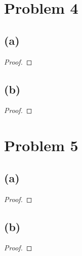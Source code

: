 \documentclass[14pt]{extarticle}
\begin{document}
\section{Problem 4}
\subsection{(a)}
\begin{proof}
\end{proof}

\subsection{(b)}
\begin{proof}
\end{proof}

\section{Problem 5}
\subsection{(a)}
\begin{proof}
\end{proof}

\subsection{(b)}
\begin{proof}
\end{proof}
\end{document}
